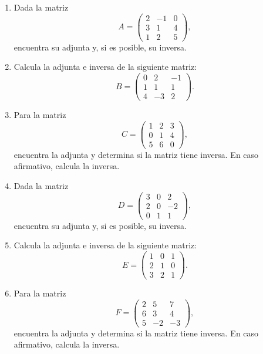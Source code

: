 \documentclass[10pt,a4paper]{article}
\begin{document}
\begin{enumerate}[resume]
    \item Dada la matriz
    \[
    A = \begin{pmatrix}
    2 & -1 & 0 \\
    3 & 1 & 4 \\
    1 & 2 & 5
    \end{pmatrix},
    \]
    encuentra su adjunta y, si es posible, su inversa.
    \item Calcula la adjunta e inversa de la siguiente matriz:
    \[
    B = \begin{pmatrix}
    0 & 2 & -1 \\
    1 & 1 & 1 \\
    4 & -3 & 2
    \end{pmatrix}.
    \]
    \item Para la matriz
    \[
    C = \begin{pmatrix}
    1 & 2 & 3 \\
    0 & 1 & 4 \\
    5 & 6 & 0
    \end{pmatrix},
    \]
    encuentra la adjunta y determina si la matriz tiene inversa. En caso afirmativo, calcula la inversa.
    \item Dada la matriz
    \[
    D = \begin{pmatrix}
    3 & 0 & 2 \\
    2 & 0 & -2 \\
    0 & 1 & 1
    \end{pmatrix},
    \]
    encuentra su adjunta y, si es posible, su inversa.
    
    \item Calcula la adjunta e inversa de la siguiente matriz:
    \[
    E = \begin{pmatrix}
    1 & 0 & 1 \\
    2 & 1 & 0 \\
    3 & 2 & 1
    \end{pmatrix}.
    \]
    
    \item Para la matriz
    \[
    F = \begin{pmatrix}
    2 & 5 & 7 \\
    6 & 3 & 4 \\
    5 & -2 & -3
    \end{pmatrix},
    \]
    encuentra la adjunta y determina si la matriz tiene inversa. En caso afirmativo, calcula la inversa.
    

\end{enumerate}
\end{document}
